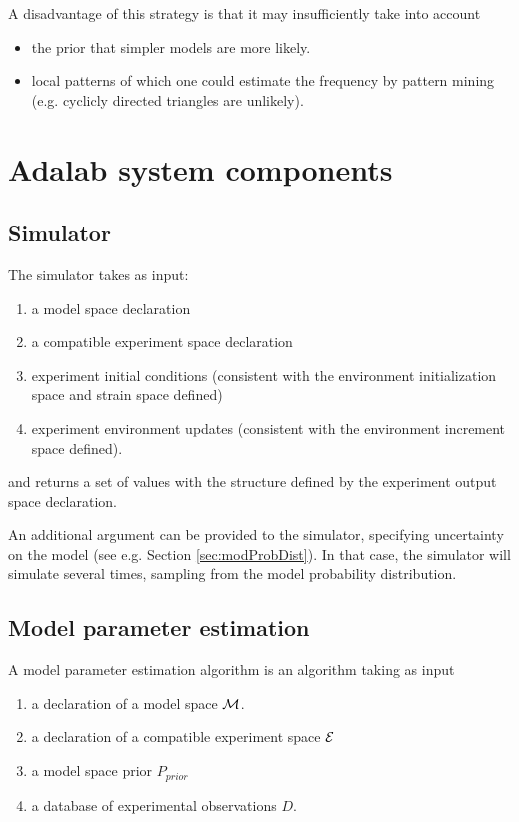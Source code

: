 \documentclass{article}
\begin{document}
A disadvantage of this strategy is that it may insufficiently take into account
\begin{itemize}
\item the prior that simpler models are more likely.
\item local patterns of which one could estimate the frequency by pattern mining (e.g. cyclicly directed triangles are unlikely).
\end{itemize}

\section{Adalab system components}

\subsection{Simulator}
The simulator takes as input:
\begin{enumerate}
\item a model space declaration
\item a compatible experiment space declaration
\item experiment initial conditions (consistent with the environment initialization space and strain space defined)
\item experiment environment updates (consistent with the environment increment space defined).
\end{enumerate}

and returns a set of values with the structure defined by the experiment output space declaration.


An additional argument can be provided to the simulator, specifying uncertainty on the model (see e.g. Section \ref{sec:modProbDist}).  In that case, the simulator will simulate several times, sampling from the model probability distribution.  


\subsection{Model parameter estimation}

A model parameter estimation algorithm is an algorithm taking as input
\begin{enumerate}
\item a declaration of a model space $\mathcal{M}$.
\item a declaration of a compatible experiment space $\mathcal{E}$
\item a model space prior $P_{prior}$
\item a database of experimental observations $D$.
\end{enumerate}
\end{document}
